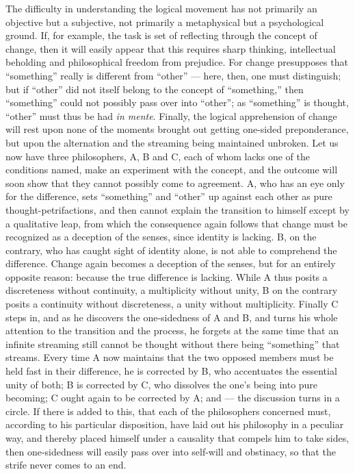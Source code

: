 \documentclass[12pt]{book}
\begin{document}
The difficulty in understanding the logical movement has not primarily an
objective but a subjective, not primarily a metaphysical but a psychological
ground. If, for example, the task is set of reflecting through the concept
of change, then it will easily appear that this requires sharp thinking,
intellectual beholding and philosophical freedom from prejudice. For change
presupposes that ``something'' really is different from ``other'' --- here,
then, one must distinguish; but if ``other'' did not itself belong to the
concept of ``something,'' then ``something'' could not possibly pass over
into ``other''; as ``something'' is thought, ``other'' must thus be had
\textit{in mente}. Finally, the logical apprehension of change will rest
upon none of the moments brought out getting one-sided preponderance, but
upon the alternation and the streaming being maintained unbroken. Let us now
have three philosophers, A, B and C, each of whom lacks one of the
conditions named, make an experiment with the concept, and the outcome will
soon show that they cannot possibly come to agreement. A, who has an eye
only for the difference, sets ``something'' and ``other'' up against each
other as pure thought-petrifactions, and then cannot explain the transition
to himself except by a qualitative leap, from which the consequence again
follows that change must be recognized as a deception of the senses, since
identity is lacking. B, on the contrary, who has caught sight of identity
alone, is not able to comprehend the difference. Change again becomes a
deception of the senses, but for an entirely opposite reason: because the
true difference is lacking. While A thus posits a discreteness without
continuity, a multiplicity without unity, B on the contrary posits a
continuity without discreteness, a unity without multiplicity. Finally C
steps in, and as he discovers the one-sidedness of A and B, and turns his
whole attention to the transition and the process, he forgets at the same
time that an infinite streaming still cannot be thought without there being
``something'' that streams. Every time A now maintains that the two opposed
members must be held fast in their difference, he is corrected by B, who
accentuates the essential unity of both; B is corrected by C, who dissolves
the one's being into pure becoming; C ought again to be corrected by A;
and --- the discussion turns in a circle. If there is added to this, that
each of the philosophers concerned must, according to his particular
disposition, have laid out his philosophy in a peculiar way, and thereby
placed himself under a causality that compels him to take sides, then
one-sidedness will easily pass over into self-will and obstinacy, so that
the strife never comes to an end.
\end{document}
